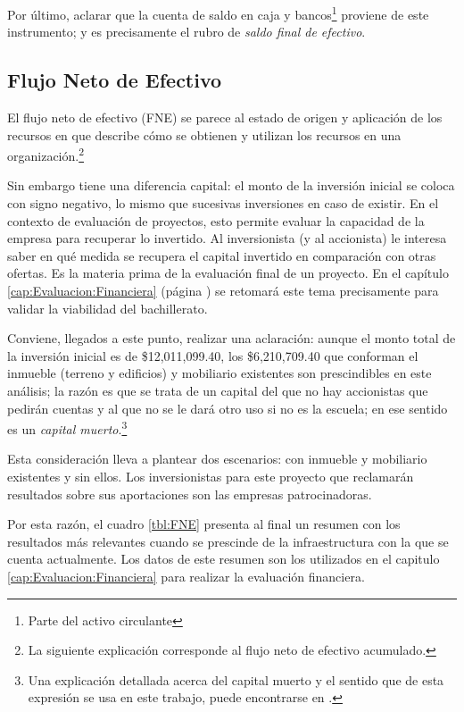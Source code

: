 Por último, aclarar que la cuenta de saldo en caja y bancos\footnote{Parte del activo circulante} proviene de este instrumento; y es precisamente el rubro de \emph{saldo final de efectivo}.



\subsection{Flujo Neto de Efectivo}
\label{sub:FNE}

El flujo neto de efectivo (FNE) se parece al estado de origen y aplicación de los recursos en que describe cómo se obtienen y utilizan los recursos en una organización.\footnote{La siguiente explicación corresponde al flujo neto de efectivo acumulado.}

Sin embargo tiene una diferencia capital: el monto de la inversión inicial se coloca con signo negativo, lo mismo que sucesivas inversiones en caso de existir. En el contexto de evaluación de proyectos, esto permite evaluar la capacidad de la empresa para recuperar lo invertido. Al inversionista (y al accionista) le interesa saber en qué medida se recupera el capital invertido en comparación con otras ofertas. Es la materia prima de la evaluación final de un proyecto. En el capítulo \ref{cap:Evaluacion:Financiera} (página \pageref{cap:Evaluacion:Financiera}) se retomará este tema precisamente para validar la viabilidad del bachillerato.

Conviene, llegados a este punto, realizar una aclaración: aunque el monto total de la inversión inicial es de \$12,011,099.40, los \$6,210,709.40 que conforman el inmueble (terreno y edificios) y mobiliario existentes son prescindibles en este análisis; la razón es que se trata de un capital del que no hay accionistas que pedirán cuentas y al que no se le dará otro uso si no es la escuela; en ese sentido es un \emph{capital muerto}.\footnote{\label{note:CapitalMuerto}Una explicación detallada acerca del capital muerto y el sentido que de esta expresión se usa en este trabajo, puede encontrarse en \cite{SOTO2000misterio}.}

Esta consideración lleva a plantear dos escenarios: con inmueble y mobiliario existentes y sin ellos. Los inversionistas para este proyecto que reclamarán resultados sobre sus aportaciones son las empresas patrocinadoras.

Por esta razón, el cuadro \ref{tbl:FNE} presenta al final un resumen con los resultados más relevantes cuando se prescinde de la infraestructura con la que se cuenta actualmente. Los datos de este resumen son los utilizados en el capitulo \ref{cap:Evaluacion:Financiera} para realizar la evaluación financiera.


